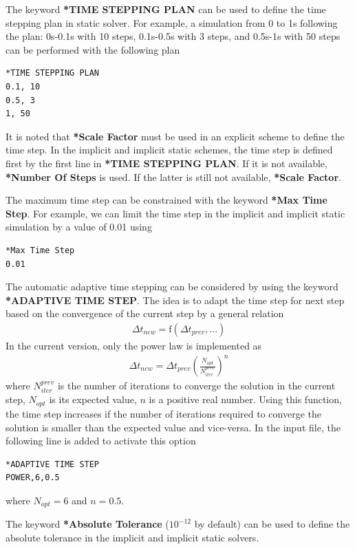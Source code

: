 \documentclass[oneside,11pt,times]{book}
\begin{document}
The keyword \textbf{*TIME STEPPING PLAN} can be used to define the time stepping plan in static solver. For example, a simulation from 0 to 1s following the plan: 0s-0.1s with 10 steps, 0.1s-0.5s with 3 steps, and 0.5s-1s with 50 steps can be performed with the following plan
\begin{lstlisting}
*TIME STEPPING PLAN
0.1, 10
0.5, 3
1, 50
\end{lstlisting}

It is noted that \textbf{*Scale Factor} must be used in an explicit scheme to define the time step. In the implicit and implicit static schemes, the time step is defined first by the first line in \textbf{*TIME STEPPING PLAN}. If it is not available, \textbf{*Number Of Steps} is used. If the latter is still not available, \textbf{*Scale Factor}.

The maximum time step can be constrained with the keyword \textbf{*Max Time Step}. For example, we can limit the time step in the implicit and implicit static simulation by a value of 0.01 using
\begin{lstlisting}
*Max Time Step
0.01
\end{lstlisting}

The automatic adaptive time stepping can be considered by using the keyword \textbf{*ADAPTIVE TIME STEP}. The idea is to adapt the time step for next step based on the convergence of the current step by a general relation
\begin{eqnarray*}
\Delta t_{new} = \text{f}(\Delta t_{prev}, ...)
\end{eqnarray*}
In the current version, only the power law is implemented as
\begin{eqnarray*}
\Delta t_{new} = \Delta t_{prev} \left(\frac{N_{opt}}{N_{iter}^{prev}} \right)^n
\end{eqnarray*}
where $N_{iter}^{prev}$ is the number of iterations to converge the solution in the current step, $N_{opt}$ is its expected value, $n$ is a positive real number. Using this function, the time step increases if the number of iterations required to converge the solution is smaller than the expected value and vice-versa. In the input file, the following line is added to activate this option
\begin{lstlisting}
*ADAPTIVE TIME STEP
POWER,6,0.5
\end{lstlisting}
where $N_{opt}=6$ and $n=0.5$.

The keyword \textbf{*Absolute Tolerance} ($10^{-12}$ by default) can be used to define the absolute tolerance in the implicit and implicit static solvers.\\
\end{document}
